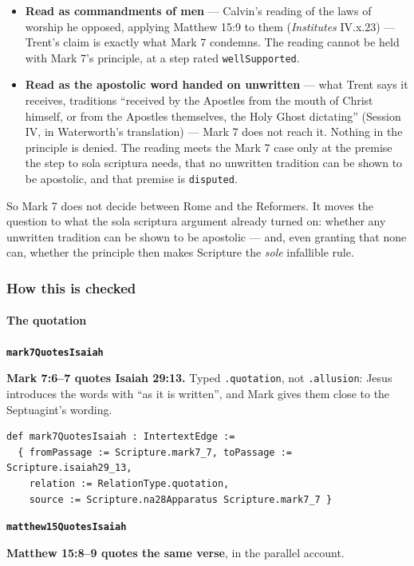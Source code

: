 \documentclass[11pt]{article}
\begin{document}
\begin{itemize}
  \item \textbf{Read as commandments of men} — Calvin’s reading of the laws of worship he opposed, applying Matthew 15:9 to them (\emph{Institutes} IV.x.23) — Trent’s claim is exactly what Mark 7 condemns. The reading cannot be held with Mark 7’s principle, at a step rated \texttt{well\allowbreak{}Supported}.
  \item \textbf{Read as the apostolic word handed on unwritten} — what Trent says it receives, traditions “received by the Apostles from the mouth of Christ himself, or from the Apostles themselves, the Holy Ghost dictating” (Session IV, in Waterworth’s translation) — Mark 7 does not reach it. Nothing in the principle is denied. The reading meets the Mark 7 case only at the premise the step to sola scriptura needs, that no unwritten tradition can be shown to be apostolic, and that premise is \texttt{disputed}.
\end{itemize}
So Mark 7 does not decide between Rome and the Reformers. It moves the question to what the sola scriptura argument already turned on: whether any unwritten tradition can be shown to be apostolic — and, even granting that none can, whether the principle then makes Scripture the \emph{sole} infallible rule.

\subsubsection*{How this is checked}
\paragraph*{The quotation}
\leavevmode\par\nobreak
\par\medskip\noindent\textbf{\texttt{mark7\allowbreak{}Quotes\allowbreak{}Isaiah}}\par\nobreak\noindent
\textbf{Mark 7:6–7 quotes Isaiah 29:13.} Typed \texttt{.quotation}, not \texttt{.allusion}: Jesus introduces the words with “as it is written”, and Mark gives them close to the Septuagint’s wording.

{\small\begin{verbatim}
def mark7QuotesIsaiah : IntertextEdge :=
  { fromPassage := Scripture.mark7_7, toPassage := Scripture.isaiah29_13,
    relation := RelationType.quotation,
    source := Scripture.na28Apparatus Scripture.mark7_7 }
\end{verbatim}}
\par\medskip\noindent\textbf{\texttt{matthew15\allowbreak{}Quotes\allowbreak{}Isaiah}}\par\nobreak\noindent
\textbf{Matthew 15:8–9 quotes the same verse}, in the parallel account.
\end{document}

